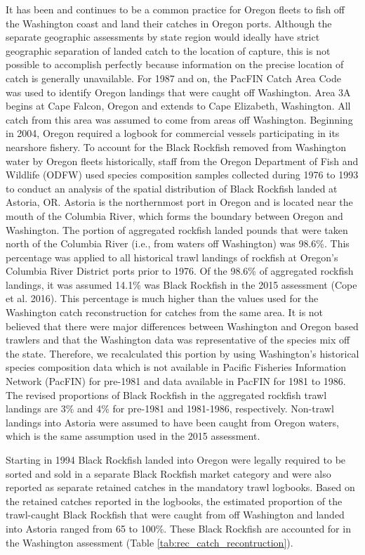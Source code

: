 \documentclass[11pt,
  letterpaper,
]{article}
\begin{document}
It has been and continues to be a common practice for Oregon fleets to fish off the Washington coast and land their catches in Oregon ports. Although the separate geographic assessments by state region would ideally have strict geographic separation of landed catch to the location of capture, this is not possible to accomplish perfectly because information on the precise location of catch is generally unavailable. For 1987 and on, the PacFIN Catch Area Code was used to identify Oregon landings that were caught off Washington. Area 3A begins at Cape Falcon, Oregon and extends to Cape Elizabeth, Washington. All catch from this area was assumed to come from areas off Washington. Beginning in 2004, Oregon required a logbook for commercial vessels participating in its nearshore fishery. To account for the Black Rockfish removed from Washington water by Oregon fleets historically, staff from the Oregon Department of Fish and Wildlife (ODFW) used species composition samples collected during 1976 to 1993 to conduct an analysis of the spatial distribution of Black Rockfish landed at Astoria, OR. Astoria is the northernmost port in Oregon and is located near the mouth of the Columbia River, which forms the boundary between Oregon and Washington. The portion of aggregated rockfish landed pounds that were taken north of the Columbia River (i.e., from waters off Washington) was 98.6\%. This percentage was applied to all historical trawl landings of rockfish at Oregon's Columbia River District ports prior to 1976. Of the 98.6\% of aggregated rockfish landings, it was assumed 14.1\% was Black Rockfish in the 2015 assessment (Cope et al. 2016). This percentage is much higher than the values used for the Washington catch reconstruction for catches from the same area. It is not believed that there were major differences between Washington and Oregon based trawlers and that the Washington data was representative of the species mix off the state. Therefore, we recalculated this portion by using Washington's historical species composition data which is not available in Pacific Fisheries Information Network (PacFIN) for pre-1981 and data available in PacFIN for 1981 to 1986. The revised proportions of Black Rockfish in the aggregated rockfish trawl landings are 3\% and 4\% for pre-1981 and 1981-1986, respectively. Non-trawl landings into Astoria were assumed to have been caught from Oregon waters, which is the same assumption used in the 2015 assessment.

Starting in 1994 Black Rockfish landed into Oregon were legally required to be sorted and sold in a separate Black Rockfish market category and were also reported as separate retained catches in the mandatory trawl logbooks. Based on the retained catches reported in the logbooks, the estimated proportion of the trawl-caught Black Rockfish that were caught from off Washington and landed into Astoria ranged from 65 to 100\%. These Black Rockfish are accounted for in the Washington assessment (Table \ref{tab:rec_catch_recontruction}).
\end{document}
